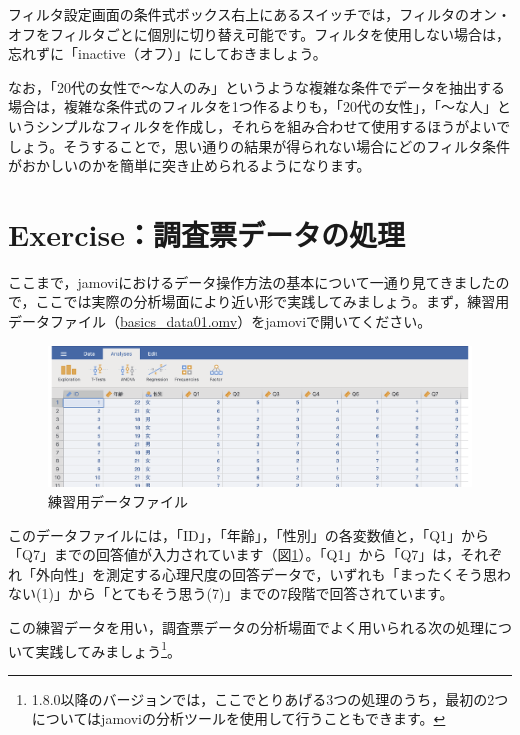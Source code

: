 \documentclass[
  12pt,
  a5jpaper,
  lualatex, ja=standard]{bxjsbook}
\begin{document}
フィルタ設定画面の条件式ボックス右上にあるスイッチでは，フィルタのオン・オフをフィルタごとに個別に切り替え可能です。フィルタを使用しない場合は，忘れずに「inactive（オフ）」にしておきましょう。

なお，「20代の女性で〜な人のみ」というような複雑な条件でデータを抽出する場合は，複雑な条件式のフィルタを1つ作るよりも，「20代の女性」，「〜な人」というシンプルなフィルタを作成し，それらを組み合わせて使用するほうがよいでしょう。そうすることで，思い通りの結果が得られない場合にどのフィルタ条件がおかしいのかを簡単に突き止められるようになります。

\hypertarget{sec:practice-handling}{%
\section{Exercise：調査票データの処理}\label{sec:practice-handling}}

ここまで，jamoviにおけるデータ操作方法の基本について一通り見てきましたので，ここでは実際の分析場面により近い形で実践してみましょう。まず，練習用データファイル（\href{https://github.com/sbtseiji/jmv_compguide/raw/main/data/omv/basics_data01.omv}{basics\_data01.omv}）をjamoviで開いてください。

\begin{figure}[!ht]

{\centering \includegraphics[width=1\linewidth]{images/basics/exercise} 

}

\caption{練習用データファイル}\label{fig:basics-exercise}
\end{figure}

このデータファイルには，「ID」，「年齢」，「性別」の各変数値と，「Q1」から「Q7」までの回答値が入力されています（図\ref{fig:basics-exercise}）。「Q1」から「Q7」は，それぞれ「外向性」を測定する心理尺度の回答データで，いずれも「まったくそう思わない(1)」から「とてもそう思う(7)」までの7段階で回答されています。

この練習データを用い，調査票データの分析場面でよく用いられる次の処理について実践してみましょう\footnote{1.8.0以降のバージョンでは，ここでとりあげる3つの処理のうち，最初の2つについてはjamoviの分析ツールを使用して行うこともできます。}。
\end{document}
